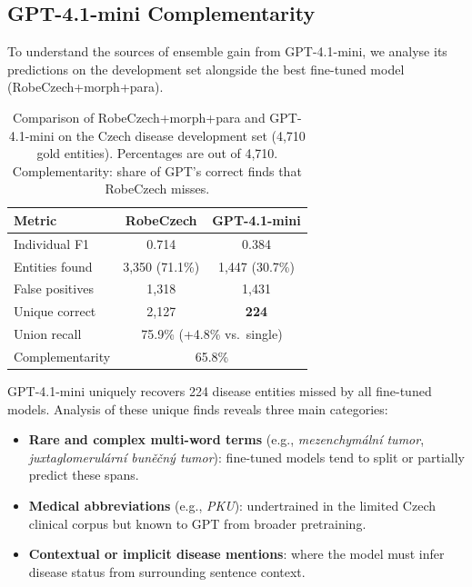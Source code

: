\documentclass[11pt]{article}
\begin{document}
\subsection{GPT-4.1-mini Complementarity}

To understand the sources of ensemble gain from GPT-4.1-mini, we analyse its
predictions on the development set alongside the best fine-tuned model (RobeCzech+morph+para).

\begin{table}[h]
\centering
\small
\begin{tabular}{lcc}
\toprule
\textbf{Metric} & \textbf{RobeCzech} & \textbf{GPT-4.1-mini} \\
\midrule
Individual F1      & 0.714  & 0.384 \\
Entities found     & 3,350 (71.1\%)  & 1,447 (30.7\%) \\
False positives    & 1,318  & 1,431 \\
Unique correct     & 2,127  & \textbf{224} \\
\midrule
Union recall       & \multicolumn{2}{c}{75.9\% (+4.8\% vs.\ single)} \\
Complementarity    & \multicolumn{2}{c}{65.8\%} \\
\bottomrule
\end{tabular}
\caption{Comparison of RobeCzech+morph+para and GPT-4.1-mini on the Czech disease
development set (4,710 gold entities). Percentages are out of 4,710.
Complementarity: share of GPT's correct finds that RobeCzech misses.}
\label{tab:gpt_analysis}
\end{table}

GPT-4.1-mini uniquely recovers 224 disease entities missed by all fine-tuned models.
Analysis of these unique finds reveals three main categories:

\begin{itemize}
  \item \textbf{Rare and complex multi-word terms} (e.g., \textit{mezenchymální tumor},
        \textit{juxtaglomerulární buněčný tumor}): fine-tuned models tend to split or
        partially predict these spans.
  \item \textbf{Medical abbreviations} (e.g., \textit{PKU}): undertrained in the
        limited Czech clinical corpus but known to GPT from broader pretraining.
  \item \textbf{Contextual or implicit disease mentions}: where the model must infer
        disease status from surrounding sentence context.
\end{itemize}
\end{document}
